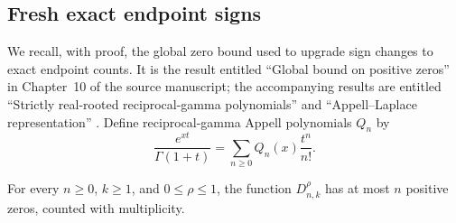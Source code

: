 \subsection{Fresh exact endpoint signs}

We recall, with proof, the global zero bound used to upgrade sign changes
to exact endpoint counts. It is the result entitled ``Global bound on
positive zeros'' in Chapter~10 of the source manuscript; the accompanying
results are entitled ``Strictly real-rooted reciprocal-gamma polynomials''
and ``Appell--Laplace representation'' \cite{ProveIt}.
Define reciprocal-gamma Appell polynomials $Q_n$ by
\[
 \frac{e^{xt}}{\Gamma(1+t)}=\sum_{n\geq0}Q_n(x)\frac{t^n}{n!}.
\]
\begin{lemma}\label{cont26:lem:bif-global-count}
For every $n\geq0$, $k\geq1$, and $0\leq\rho\leq1$, the function
$D_{n,k}^{\rho}$ has at most $n$ positive zeros, counted with multiplicity.
\end{lemma}
